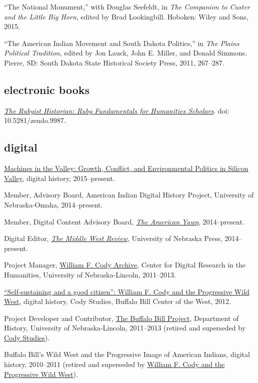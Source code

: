 ``The National Monument,'' with Douglas Seefeldt, in \emph{The Companion
to Custer and the Little Big Horn}, edited by Brad Lookingbill. Hoboken:
Wiley and Sons, 2015.

``The American Indian Movement and South Dakota Politics,'' in \emph{The
Plains Political Tradition}, edited by Jon Lauck, John E. Miller, and
Donald Simmons. Pierre, SD: South Dakota State Historical Society Press,
2011, 267--287.

\subsection{electronic books}\label{electronic-books}

\emph{\href{http://hepplerj.github.io/rubyist-historian/}{The Rubyist
Historian: Ruby Fundamentals for Humanities Scholars}}. doi:
10.5281/zendo.9987.

\subsection{digital}\label{digital}

\href{http://dissertation.jasonheppler.org}{Machines in the Valley:
Growth, Conflict, and Environmental Politics in Silicon Valley}, digital
history, 2015--present.

Member, Advisory Board, American Indian Digital History Project,
University of Nebraska-Omaha, 2014--present.

Member, Digital Content Advisory Board,
\emph{\href{http://www.americanyawp.com/}{The American Yawp}},
2014--present.

Digital Editor, \emph{\href{https://uimiddle.wordpress.com/}{The Middle
West Review}}, University of Nebraska Press, 2014--present.

Project Manager, \href{http://codyarchive.org/}{William F. Cody
Archive}, Center for Digital Research in the Humanities, University of
Nebraska-Lincoln, 2011--2013.

\href{http://www.codystudies.org/showindians/}{``Self-sustaining and a
good citizen'': William F. Cody and the Progressive Wild West}, digital
history, Cody Studies, Buffalo Bill Center of the West, 2012.

Project Developer and Contributor,
\href{http://buffalobillproject.unl.edu/}{The Buffalo Bill Project},
Department of History, University of Nebraska-Lincoln, 2011--2013
(retired and superseded by \href{http://www.codystudies.org/}{Cody
Studies}).

Buffalo Bill's Wild West and the Progressive Image of American Indians,
digital history, 2010--2011 (retired and superseded by
\href{http://www.codystudies.org/showindians/}{William F. Cody and the
Progressive Wild West}).

